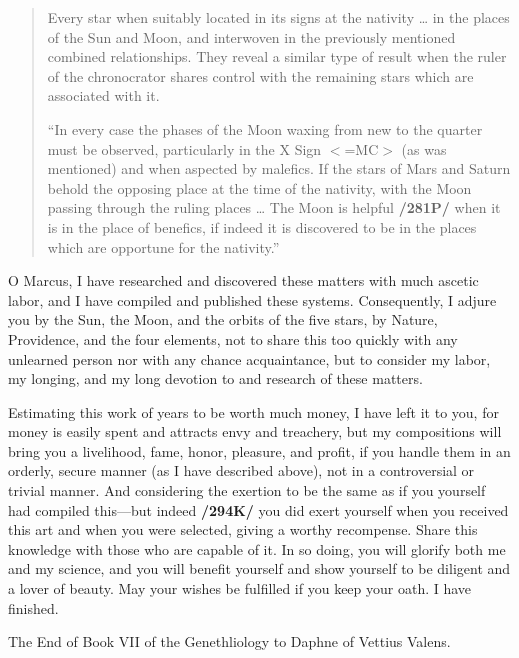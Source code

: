 \begin{quote}
Every star when suitably located in its signs at the nativity … in the places of the Sun and Moon, and interwoven in the previously mentioned combined relationships. They reveal a similar type of result when the ruler of the chronocrator shares control with the remaining
stars which are associated with it.

“In every case the phases of the Moon waxing from new to the quarter must be observed, particularly in the X Sign $<$=MC$>$ (as was mentioned) and when aspected by malefics. If the stars of
Mars and Saturn behold the opposing place at the time of the nativity, with the Moon passing through the ruling places … The Moon is helpful \textbf{/281P/} when it is in the place of benefics, if indeed
it is discovered to be in the places which are opportune for the nativity.”
\end{quote}

O Marcus, I have researched and discovered these matters with much ascetic labor, and I have compiled and published these systems. Consequently, I adjure you by the Sun, the Moon, and the orbits of the five stars, by Nature, Providence, and the four elements, not to share this too quickly with any unlearned person nor with any chance acquaintance, but to consider my labor, my longing, and my long devotion to and research of these matters. 

Estimating this work of years to be worth much money, I have left it to you, for money is easily spent and attracts envy and treachery, but my compositions will bring you a livelihood, fame, honor, pleasure, and profit, if you handle them in an orderly, secure manner (as I have described above), not in a controversial or trivial manner. And considering the exertion to be the same as if you yourself had compiled this—but indeed \textbf{/294K/} you did exert yourself when you received this art and when you were selected, giving a worthy recompense. Share this knowledge with those who are capable of it. In so doing, you will glorify both me and my science, and you will benefit yourself and show yourself to be diligent and a lover of beauty.
May your wishes be fulfilled if you keep your oath. I have finished.

The End of Book VII of the Genethliology to Daphne of Vettius Valens.

\newpage